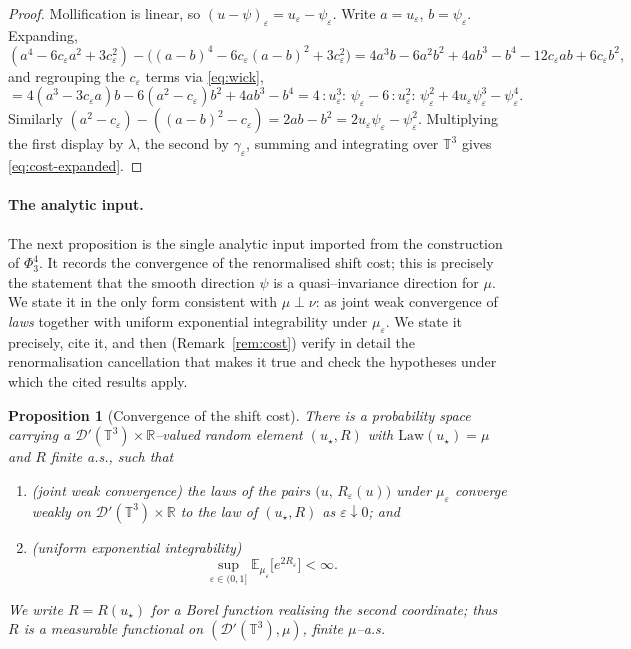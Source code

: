 \documentclass[12pt]{article}
\newtheorem{proposition}{Proposition}
\theoremstyle{definition}
\newcommand{\T}{\mathbb{T}^3}
\newcommand{\R}{\mathbb{R}}
\newcommand{\E}{\mathbb{E}}
\newcommand{\D}{\mathcal{D}'(\T)}
\newcommand{\Wick}[1]{\,{:}#1{:}\,}
\begin{document}
\begin{proof}
Mollification is linear, so $(u-\psi)_\varepsilon=u_\varepsilon-\psi_\varepsilon$. Write
$a=u_\varepsilon$, $b=\psi_\varepsilon$. Expanding,
\[
  (a^4-6c_\varepsilon a^2+3c_\varepsilon^2)-\big((a-b)^4-6c_\varepsilon(a-b)^2+3c_\varepsilon^2\big)
  =4a^3b-6a^2b^2+4ab^3-b^4-12c_\varepsilon ab+6c_\varepsilon b^2 ,
\]
and regrouping the $c_\varepsilon$ terms via \eqref{eq:wick},
\[
  =4(a^3-3c_\varepsilon a)b-6(a^2-c_\varepsilon)b^2+4ab^3-b^4
  =4\Wick{u_\varepsilon^3}\psi_\varepsilon-6\Wick{u_\varepsilon^2}\psi_\varepsilon^2
   +4u_\varepsilon\psi_\varepsilon^3-\psi_\varepsilon^4 .
\]
Similarly $(a^2-c_\varepsilon)-((a-b)^2-c_\varepsilon)=2ab-b^2=2u_\varepsilon\psi_\varepsilon-\psi_\varepsilon^2$.
Multiplying the first display by $\lambda$, the second by $\gamma_\varepsilon$, summing and
integrating over $\T$ gives \eqref{eq:cost-expanded}.
\end{proof}

\paragraph{The analytic input.}
The next proposition is the single analytic input imported from the construction of
$\Phi^4_3$. It records the convergence of the renormalised shift cost; this is precisely
the statement that the smooth direction $\psi$ is a quasi--invariance direction for $\mu$.
We state it in the only form consistent with $\mu\perp\nu$: as joint weak convergence of
\emph{laws} together with uniform exponential integrability under $\mu_\varepsilon$. We
state it precisely, cite it, and then (Remark~\ref{rem:cost}) verify in detail the
renormalisation cancellation that makes it true and check the hypotheses under which the
cited results apply.

\begin{proposition}[Convergence of the shift cost]\label{prop:cost}
There is a probability space carrying a $\D\times\R$--valued random element $(u_\star,R)$
with $\mathrm{Law}(u_\star)=\mu$ and $R$ finite a.s., such that
\begin{enumerate}
\item[\textup{(i)}] \emph{(joint weak convergence)} the laws of the pairs
$\big(u,\,R_\varepsilon(u)\big)$ under $\mu_\varepsilon$ converge weakly on $\D\times\R$ to
the law of $(u_\star,R)$ as $\varepsilon\downarrow0$; and
\item[\textup{(ii)}] \emph{(uniform exponential integrability)}
\begin{equation}\label{eq:UI}
  \sup_{\varepsilon\in(0,1]}\E_{\mu_\varepsilon}\!\big[e^{2R_\varepsilon}\big]<\infty .
\end{equation}
\end{enumerate}
We write $R=R(u_\star)$ for a Borel function realising the second coordinate; thus $R$ is a
measurable functional on $(\D,\mu)$, finite $\mu$--a.s.
\end{proposition}
\end{document}
